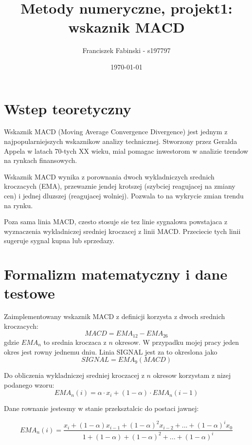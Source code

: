\documentclass[a4paper,12pt]{article}  %
\title{Metody numeryczne, projekt1:\\ wskaznik MACD}
\author{Franciszek Fabinski - s197797}
\date{\today}
\begin{document}
\maketitle  %


\section{Wstep teoretyczny}
Wskaznik MACD (Moving Average Convergence Divergence) jest jednym z
najpopularniejszych wskaznikow analizy technicznej. Stworzony przez 
Geralda Appela w latach 70-tych XX wieku, mial pomagac inwestorom
w analizie trendow na rynkach finansowych. 

Wskaznik MACD wynika z porownania dwoch wykladniczych srednich kroczacych (EMA), przewaznie
jendej krotszej (szybciej reagujacej na zmiany cen) i jednej dluzszej
(reagujacej wolniej). Pozwala to na wykrycie zmian trendu na rynku.

Poza sama linia MACD, czesto stosuje sie tez linie sygnalowa powstajaca
z wyznaczenia wykladniczej sredniej kroczacej z linii MACD. Przeciecie tych linii 
sugeruje sygnal kupna lub sprzedazy.

\section{Formalizm matematyczny i dane testowe}
Zaimplementowany wskaznik MACD z definicji korzysta z dwoch srednich kroczacych:
\begin{equation}
    MACD = EMA_{12} - EMA_{26}
\end{equation}
gdzie $EMA_{n}$ to srednia kroczaca z $n$ okresow.
W przypadku mojej pracy jeden okres jest rowny jednemu dniu.
Linia SIGNAL jest za to okreslona jako
\begin{equation}
    SIGNAL = EMA_{9}(MACD)
\end{equation}


\pagebreak


Do obliczenia wykladniczej sredniej kroczacej z $n$ okresow korzystam z nizej
podanego wzoru:
\begin{equation}
    EMA_{n}(i) = \alpha \cdot x_i + (1 - \alpha) \cdot EMA_{n}(i-1)
\end{equation}


Dane rownanie jestesmy w stanie przeksztalcic do postaci jawnej:

\begin{equation}
  EMA_n(i) = \frac{x_i + (1-\alpha)x_{i-1} + (1-\alpha)^2 x_{i-2} + ... +
  (1-\alpha)^i x_0}{1 + (1-\alpha) + (1-\alpha)^2 + ... + (1-\alpha)^i}
\end{equation}
\end{document}
